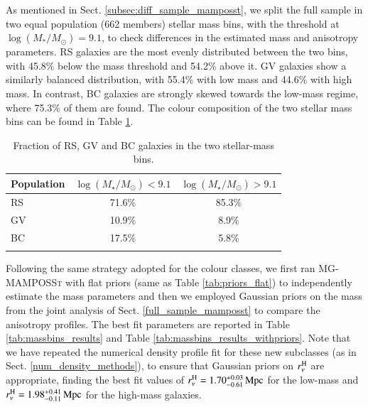 \documentclass{aa}
\begin{document}
As mentioned in Sect. \ref{subsec:diff_sample_mamposst}, we split the full sample in two equal population (662 members) stellar mass bins, with the threshold at $\log (M_*/M_\odot) = 9.1$, to check differences in the estimated mass and anisotropy parameters. RS galaxies are the most evenly distributed between the two bins, with 45.8\% below the mass threshold and 54.2\% above it. GV galaxies show a similarly balanced distribution, with 55.4\% with low mass and 44.6\% with high mass. In contrast, BC galaxies are strongly skewed towards the low-mass regime, where 75.3\% of them are found. The colour composition of the two stellar mass bins can be found in Table \ref{tab:composition_colors}. 

\begin{table}
\centering
\renewcommand{\arraystretch}{1.3} %
\caption{Fraction of RS, GV and BC galaxies in the two stellar-mass bins.}
\begin{tabular}{lcc}
\hline
Population & $\log (M_\star/M_\odot) < 9.1$ & $\log (M_\star/M_\odot) > 9.1$ \\
\hline
RS & 71.6\% & 85.3\% \\
GV & 10.9\% & 8.9\% \\
BC & 17.5\% & 5.8\% \\
\hline
\label{tab:composition_colors}
\end{tabular}
\end{table}

Following the same strategy adopted for the colour classes, we first ran \textsc{MG-MAMPOSSt} with flat priors (same as Table \ref{tab:priors_flat}) to independently estimate the mass parameters and then we employed Gaussian priors on the mass from the joint analysis of Sect. \ref{full_sample_mamposst} to compare the anisotropy profiles. The best fit parameters are reported in Table \ref{tab:massbins_results} and Table \ref{tab:massbins_results_withpriors}. Note that we have repeated the numerical density profile fit for these new subclasses (as in Sect. \ref{num_density_methods}), to ensure that Gaussian priors on $r_\nu^{\rm H}$ are appropriate, finding the best fit values of $r_\nu^{\rm H}=1.70_{-0.61}^{+0.03} \, \mathrm{Mpc}$ for the low-mass and $r_\nu^{\rm H}=1.98_{-0.11}^{+0.41} \, \mathrm{Mpc}$ for the high-mass galaxies.
\end{document}
